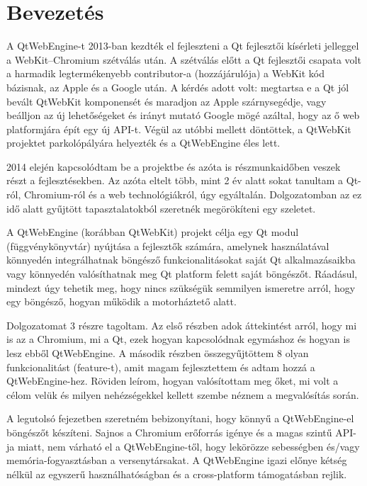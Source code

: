\documentclass[12pt]{report}
\begin{document}

\chapter*{Bevezetés}
A QtWebEngine-t 2013-ban kezdték el fejleszteni a Qt fejlesztői kísérleti jelleggel
a WebKit--Chromium szétválás után. A szétválás előtt a Qt fejlesztői csapata volt a harmadik
legtermékenyebb contributor-a (hozzájárulója) a WebKit kód bázisnak, az Apple és a
Google után. A kérdés adott volt: megtartsa e a Qt jól bevált QtWebKit komponensét és
maradjon az Apple szárnysegédje, vagy beálljon az új lehetőségeket és irányt mutató Google
mögé azáltal, hogy az ő web platformjára épít egy új API-t. Végül az utóbbi mellett
döntöttek, a QtWebKit projektet parkolópályára helyezték és a QtWebEngine éles lett.
\cite{bib:qt-blog-introducing-qtwebengine}

2014 elején kapcsolódtam be a projektbe és azóta is részmunkaidőben veszek részt a
fejlesztésekben. Az azóta eltelt több, mint 2 év alatt sokat tanultam a Qt-ról,
Chromium-ról és a web technológiákról, úgy egyáltalán. Dolgozatomban az ez idő alatt
gyűjtött tapasztalatokból szeretnék megörökíteni egy szeletet.

A QtWebEngine (korábban QtWebKit) projekt célja egy Qt modul (függvénykönyvtár) nyújtása a
fejlesztők számára, amelynek használatával könnyedén integrálhatnak böngésző
funkcionalitásokat saját Qt alkalmazásaikba vagy könnyedén valósíthatnak meg Qt platform
felett saját böngészőt. Ráadásul, mindezt úgy tehetik meg, hogy nincs szükségük semmilyen
ismeretre arról, hogy egy böngésző, hogyan működik a motorháztető alatt.

Dolgozatomat 3 részre tagoltam. Az első részben adok áttekintést arról, hogy mi is az a
Chromium, mi a Qt, ezek hogyan kapcsolódnak egymáshoz és hogyan is lesz ebből QtWebEngine.
A második részben összegyűjtöttem 8 olyan funkcionalitást (feature-t), amit magam
fejlesztettem és adtam hozzá a QtWebEngine-hez. Röviden leírom, hogyan valósítottam meg
őket, mi volt a célom velük és milyen nehézségekkel kellett szembe néznem a megvalósítás
során.

A legutolsó fejezetben szeretném bebizonyítani, hogy könnyű a QtWebEngine-el böngészőt
készíteni. Sajnos a Chromium erőforrás igénye és a magas szintű API-ja miatt, nem várható el
a QtWebEngine-től, hogy lekörözze sebességben és/vagy memória-fogyasztásban a versenytársakat.
A QtWebEngine igazi előnye kétség nélkül az egyszerű használhatóságban és a cross-platform
támogatásban rejlik.
\end{document}
